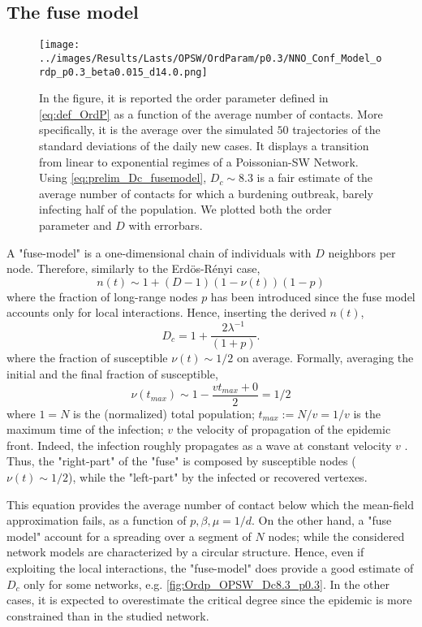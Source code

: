 \documentclass[a4paper,10pt, oneside]{book} %
\theoremstyle{definition}
\begin{document}
\subsection*{The fuse model}
\label{sec:simple_D_c_fuse_model}
\begin{figure}[t]
	\texttt{[image: ../images/Results/Lasts/OPSW/OrdParam/p0.3/NNO\_Conf\_Model\_ordp\_p0.3\_beta0.015\_d14.0.png]}
	\centering
	\caption{In the figure, it is reported the order parameter defined in \autoref{eq:def_OrdP} as a function of the average number of contacts. More specifically, it is the average over the simulated $50$ trajectories of the standard deviations of the daily new cases. It displays a transition from linear to exponential regimes of a Poissonian-SW Network. Using \autoref{eq:prelim_Dc_fusemodel}, $D_c \sim 8.3$ is a fair estimate of the average number of contacts for which a burdening outbreak, barely infecting half of the population. We plotted both the order parameter and $D$ with errorbars.}
	\label{fig:SD_Threshold_Fuse_Model}
\end{figure}
A "fuse-model" is a one-dimensional chain of individuals with $D$ neighbors per node.
Therefore, similarly to the Erdös-Rényi case, 
\begin{equation}
	n(t) \sim 1+ (D-1)(1-\nu(t))(1-p)
	\label{eq:n(t)_fusemodel}
\end{equation}
where the fraction of long-range nodes $ p$ has been introduced since the fuse model accounts only for local interactions. 
Hence, inserting the derived $ n(t)$,
\begin{equation}
	D_c = 1 + \frac{2 \lambda^{-1}}{(1+p)}.
	\label{eq:simple_Dc_fusemodel}
\end{equation} 
where the fraction of susceptible $ \nu(t) \sim 1/2$ on average.  
Formally, averaging the initial and the final fraction of susceptible, 
\begin{equation}
	\nu(t_{max}) \sim 1-\frac{vt_{max}+0}{2} = 1/2
\end{equation}
where $1 = N$ is the (normalized) total population; $ t_{max}:= N/v = 1/v$ is the maximum time of the infection; $v$ the velocity of propagation of the epidemic front.  
Indeed, the infection roughly propagates as a wave at constant velocity $v$ . Thus, the "right-part" of the "fuse" is composed by susceptible nodes ($\nu(t) \sim 1/2$), while the "left-part" by the infected or recovered vertexes.

This equation provides the average number of contact below which the mean-field approximation fails, as a function of $p,\beta,\mu = 1/d$. On the other hand, a "fuse model" account for a spreading over a segment of $N$ nodes; while the considered network models are characterized by a circular structure. Hence, even if exploiting the local interactions, the "fuse-model" does provide a good estimate of $ D_c$ only for some networks, e.g. \autoref{fig:Ordp_OPSW_Dc8.3_p0.3}. In the other cases, it is expected to overestimate the critical degree since the epidemic is more constrained than in the studied network.
\end{document}
